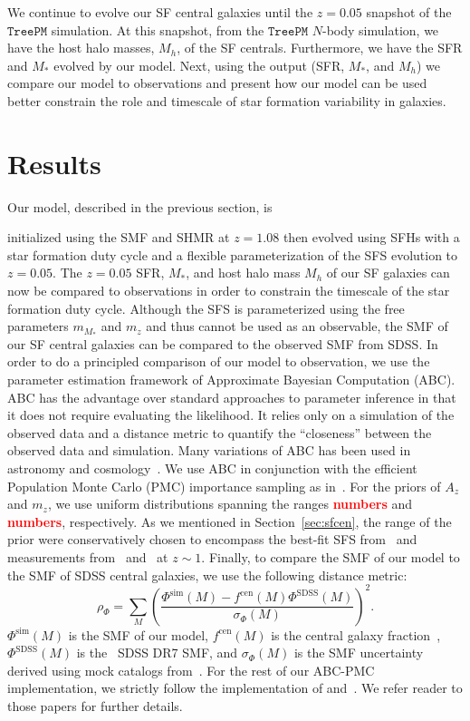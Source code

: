\documentclass[12pt, letterpaper, preprint]{aastex}
\newcommand{\todo}[1]{{\bf \textcolor{red}{#1}}}
\newcommand{\beq}{\begin{equation}}
\newcommand{\eeq}{\end{equation}}
\begin{document}
We continue to evolve our SF central galaxies until the $z = 0.05$ snapshot 
of the $\mathtt{TreePM}$ simulation. At this snapshot, from the $\mathtt{TreePM}$ 
$N$-body simulation, we have the host halo masses, $M_h$, of the SF centrals. 
Furthermore, we have the SFR and $M_*$ evolved by our model. Next, using the 
output (SFR, $M_*$, and $M_h$) we compare our model to observations and present 
how our model can be used better constrain the role and timescale of star 
formation variability in galaxies.  

\section{Results}
Our model, described in the previous section, is 

initialized using the SMF 
and SHMR at $z = 1.08$ then evolved using SFHs with a star formation duty 
cycle and a flexible parameterization of the SFS evolution to $z = 0.05$. 
The $z= 0.05$ SFR, $M_*$, and host halo mass $M_h$ of our SF galaxies can 
now be compared to observations in order to constrain the timescale of the 
star formation duty cycle. Although the SFS is parameterized using the free
parameters $m_{M_*}$ and $m_z$ and thus cannot be used as an observable, 
the SMF of our SF central galaxies can be compared to the observed SMF from 
SDSS. 
In order to do a principled
comparison of our model to observation, we use the parameter estimation framework 
of Approximate Bayesian Computation (ABC). ABC has the advantage over standard 
approaches to parameter inference in that it does not 
require evaluating the likelihood. It relies only on a simulation of the observed 
data and a distance metric to quantify the ``closeness'' between the observed data
and simulation. Many variations of ABC has been used in astronomy and 
cosmology~\citep[\emph{e.g.}][]{cameron2012,weyant2013,ishida2015,alsing2018}. 
We use ABC in conjunction with the efficient Population Monte Carlo (PMC)
importance sampling as in~\citep{hahn2016, hahn2017}. For the priors of $A_z$ and $m_z$, 
we use uniform distributions spanning the ranges \todo{numbers} and \todo{numbers}, 
respectively. As we mentioned in Section~\ref{sec:sfcen}, the range of the prior 
were conservatively chosen to encompass the best-fit SFS from~\cite{speagle2014} 
and measurements from~\cite{moustakas2013} and~\cite{lee2015} at $z \sim 1$. 
Finally, to compare the SMF of our model to the SMF of SDSS central galaxies, 
we use the following distance metric: 
\beq
\rho_\Phi = \sum\limits_{M} \left( \frac{\Phi^\mathrm{sim}(M) - f^\mathrm{cen}(M) \Phi^\mathrm{SDSS}(M)}{\sigma_\Phi(M)}\right)^2.
\eeq
$\Phi^\mathrm{sim}(M)$ is the SMF of our model, $f^\mathrm{cen}(M)$ is the
central galaxy fraction~\cite{wetzel2013}, $\Phi^\mathrm{SDSS}(M)$ is 
the~\cite{li2009} SDSS DR7 SMF, and $\sigma_\Phi(M)$ is the SMF uncertainty 
derived using mock catalogs from~\cite{li2009}. For the rest of our ABC-PMC 
implementation, we strictly follow the implementation of \cite{hahn2017b} 
and~\cite{hahn2017a}. We refer reader to those papers for further details.
\end{document}
